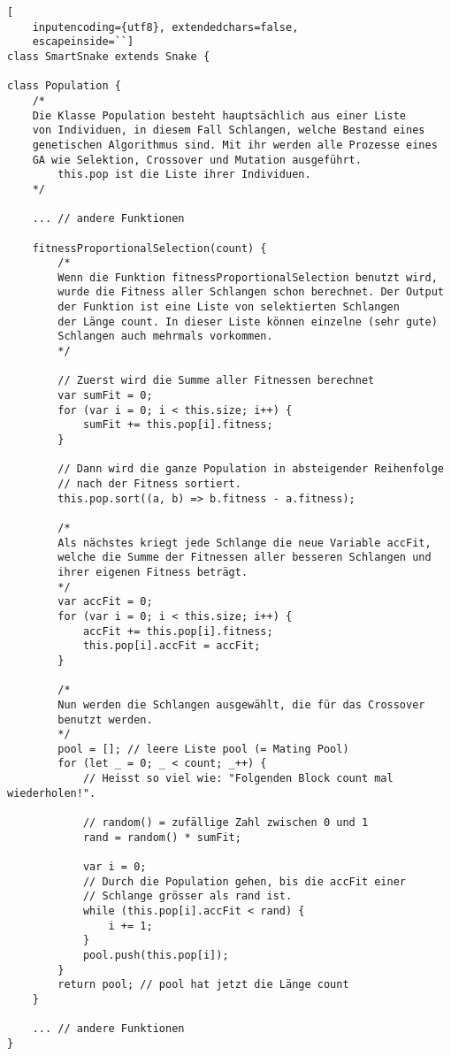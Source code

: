 \documentclass[11pt,a4paper,ngerman]{article}
\begin{document}
\begin{lstlisting}[
    inputencoding={utf8}, extendedchars=false,  
    escapeinside=``]
class SmartSnake extends Snake {

class Population {
    /*
    Die Klasse Population besteht hauptsächlich aus einer Liste
    von Individuen, in diesem Fall Schlangen, welche Bestand eines 
    genetischen Algorithmus sind. Mit ihr werden alle Prozesse eines 
    GA wie Selektion, Crossover und Mutation ausgeführt.
        this.pop ist die Liste ihrer Individuen.
    */

    ... // andere Funktionen

    fitnessProportionalSelection(count) {
        /* 
        Wenn die Funktion fitnessProportionalSelection benutzt wird, 
        wurde die Fitness aller Schlangen schon berechnet. Der Output
        der Funktion ist eine Liste von selektierten Schlangen 
        der Länge count. In dieser Liste können einzelne (sehr gute) 
        Schlangen auch mehrmals vorkommen.
        */

        // Zuerst wird die Summe aller Fitnessen berechnet
        var sumFit = 0;
        for (var i = 0; i < this.size; i++) {
            sumFit += this.pop[i].fitness;
        }

        // Dann wird die ganze Population in absteigender Reihenfolge 
        // nach der Fitness sortiert.
        this.pop.sort((a, b) => b.fitness - a.fitness);

        /*
        Als nächstes kriegt jede Schlange die neue Variable accFit,
        welche die Summe der Fitnessen aller besseren Schlangen und
        ihrer eigenen Fitness beträgt.
        */
        var accFit = 0;
        for (var i = 0; i < this.size; i++) {
            accFit += this.pop[i].fitness;
            this.pop[i].accFit = accFit;
        }

        /*
        Nun werden die Schlangen ausgewählt, die für das Crossover 
        benutzt werden.
        */
        pool = []; // leere Liste pool (= Mating Pool)
        for (let _ = 0; _ < count; _++) { 
            // Heisst so viel wie: "Folgenden Block count mal wiederholen!".

            // random() = zufällige Zahl zwischen 0 und 1
            rand = random() * sumFit; 
            
            var i = 0;
            // Durch die Population gehen, bis die accFit einer 
            // Schlange grösser als rand ist.
            while (this.pop[i].accFit < rand) { 
                i += 1;
            }
            pool.push(this.pop[i]);
        }
        return pool; // pool hat jetzt die Länge count
    }

    ... // andere Funktionen
}

\end{lstlisting}
\end{document}
